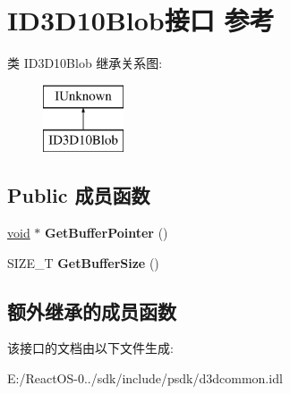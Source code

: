 \hypertarget{interface_i_d3_d10_blob}{}\section{I\+D3\+D10\+Blob接口 参考}
\label{interface_i_d3_d10_blob}
类 I\+D3\+D10\+Blob 继承关系图\+:\begin{figure}[H]
\begin{center}
\leavevmode
\includegraphics[height=2.000000cm]{interface_i_d3_d10_blob}
\end{center}
\end{figure}
\subsection*{Public 成员函数}
\begin{DoxyCompactItemize}
\item 
\mbox{\label{interface_i_d3_d10_blob_af0ec696760d49d01c69b57f1d7b01429}} 
\hyperlink{interfacevoid}{void} $\ast$ {\bfseries Get\+Buffer\+Pointer} ()
\item 
\mbox{\label{interface_i_d3_d10_blob_a1eb1d2f2d0667b539e0968b94bcaf511}} 
S\+I\+Z\+E\+\_\+T {\bfseries Get\+Buffer\+Size} ()
\end{DoxyCompactItemize}
\subsection*{额外继承的成员函数}


该接口的文档由以下文件生成\+:\begin{DoxyCompactItemize}
\item 
E\+:/\+React\+O\+S-\/0../sdk/include/psdk/d3dcommon.\+idl\end{DoxyCompactItemize}
